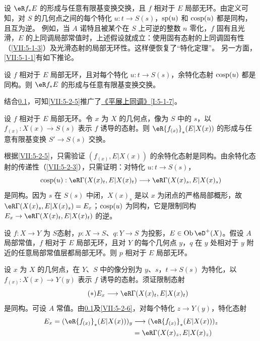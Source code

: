 \subsection{}\label{VII:5-2-4}
设 $\eR f_\ast E$ 的形成与任意有限基变换交换，且 $f$ 相对于 $E$ 局部无环。由定义可知，对 $S$ 的几何点之间的每个特化 $u:t\to S(s)$，$\operatorname{sp}(u)$ 和 $\operatorname{cosp}(u)$ 都是同构，且互为逆。
例如，当 $A$ 诺特且被某个在 $S$ 上可逆的整数 $n$ 零化，$f$ 固有且光滑，$E$ 的上同调局部常值时，上述假设就成立：使用固有态射的上同调固有性（\ref{VII:5-1-3}）及光滑态射的局部无环性\cite[XV]{sga4}。这样便恢复了“特化定理”\cite[XVI 2.1]{sga4}。
另一方面，\ref{VII:5-1-1}有如下推论。
\begin{proposition_}\label{VII:5-2-5}
设 $f$ 相对于 $E$ 局部无环，且对每个特化 $u:t\to S(s)$，余特化态射 $\operatorname{cosp}(u)$ 都是同构。则 $\eR f_\ast E$ 的形成与任意有限基变换交换。
\end{proposition_}
结合\ref{VII:5-2-4}，可知\ref{VII:5-2-5}推广了\hyperref[I]{《平展上同调》}\ref{I:5-1-7}。
\begin{corollary_}\label{VII:5-2-6}
设 $f$ 相对于 $E$ 局部无环。令 $x$ 为 $X$ 的几何点，像为 $S$ 中的 $s$，以 $f_{(x)}:X(x)\to S(s)$ 表示 $f$ 诱导的态射。则 $\eR{f_{(x)}}_\ast(E|X(x))$ 的形成与任意有限基变换 $S'\to S(s)$ 交换。
\end{corollary_}
根据\ref{VII:5-2-5}，只需验证 $(f_{(x)},E|X(x))$ 的余特化态射是同构。由余特化态射的传递性（\ref{VII:5-2-3}），只需证明：对特化 $u:t\to S(s)$，
\[
 \cosp(u):\eR\Gamma(X(x)_t,E|X(x)_t)\longrightarrow\eR\Gamma(X(x)_s,E|X(x)_s)
\]
是同构。因为 $s$ 在 $S(s)$ 中闭，$X(x)_s$ 是以 $x$ 为闭点的严格局部概形，故 $\eR\Gamma(X(x)_s,E|X(x)_s)=E_x$；$\operatorname{cosp}(u)$ 为同构，它是限制同构 $E_x\to\eR\Gamma(X(x)_t,E|X(x)_t)$ 的逆。
\begin{corollary_}\label{VII:5-2-7}
设 $f:X\to Y$ 为 $S$态射，$p:X\to S$、$q:Y\to S$ 为投影，$E\in\ob\eD^+(X)$。假设 $A$ 局部常值，$f$ 相对于 $E$ 局部无环，且对 $Y$ 的每个几何点 $y$，$q$ 在 $y$ 处相对于 $y$ 附近的任意局部常值层都局部无环。则 $p$ 相对于 $E$ 局部无环。
\end{corollary_}
设 $x$ 为 $X$ 的几何点，在 $Y$、$S$ 中的像分别为 $y$、$s$，$t\to S(s)$ 为特化，以 $f_{(x)}:X(x)\to Y(y)$ 表示 $f$ 诱导的态射。须证限制态射
\begin{equation*}\tag{$*$}\label{VII:eq:5-2-7-1}
 E_x\longrightarrow\eR\Gamma(X(x)_t,E|X(x)_t)
\end{equation*}
是同构。可设 $A$ 常值。由\ref{VII:5-2-4}及\ref{VII:5-2-6}，对每个特化 $z\to Y(y)$，特化态射
\begin{align*}
 E_x=(\eR{f_{(x)}}_\ast(E|X(x)))_y
 &\longrightarrow(\eR{f_{(x)}}_\ast(E|X(x)))_z\\
 &=\eR\Gamma(X(x)_z,E|X(x)_z)
\end{align*}
